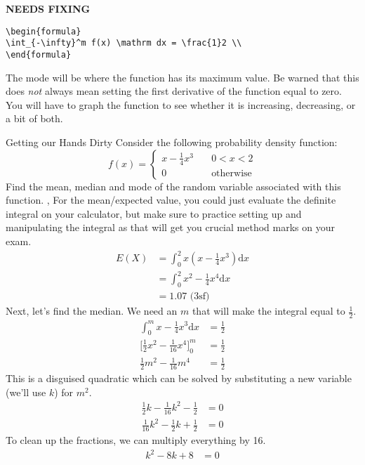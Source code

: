 \documentclass[../../main.tex]{subfiles}
\begin{document}
{\hfill\Large\bfseries NEEDS FIXING\hfill}
\begin{lstlisting}
\begin{formula}
\int_{-\infty}^m f(x) \mathrm dx = \frac{1}2 \\
\end{formula}
 \end{lstlisting}
The mode will be where the function has its maximum value. Be warned that this does \textit{not} always mean setting the first derivative of the function equal to zero. You will have to graph the function to see whether it is increasing, decreasing, or a bit of both.
\begin{example}{Getting our Hands Dirty}
Consider the following probability density function:
$$f(x) = 
        \begin{cases}
            x - \frac{1}{4}x^3 & \quad 0 < x < 2 \\
            0 & \quad \text{otherwise}
        \end{cases}
$$
Find the mean, median and mode of the random variable associated with this function. 
\sep
For the mean/expected value, you could just evaluate the definite integral on your calculator, but make sure to practice setting up and manipulating the integral as that will get you crucial method marks on your exam.
\begin{align}
    E(X) &= \int_0^2 x(x - \frac{1}{4}x^3) \mathrm dx \\
    &= \int_0^2 x^2- \frac{1}{4}x^4 \mathrm dx \\
    &= 1.07 \text{ (3sf)}
\end{align}
Next, let's find the median. We need an $m$ that will make the integral equal to $\frac{1}2$.
\begin{align}
    \int_0^m x - \frac{1}{4}x^3 \mathrm dx &= \frac{1}2 \\
    \Big[\frac{1}{2}x^2 - \frac{1}{16}x^4\Big]_0^m &= \frac{1}2 \\
    \frac{1}{2}m^2 - \frac{1}{16}m^4 &= \frac{1}2
\end{align}
This is a disguised quadratic which can be solved by substituting a new variable (we'll use $k$) for $m^2$.
\begin{align}
    \frac{1}{2}k - \frac{1}{16}k^2 - \frac{1}2 &= 0 \\
    \frac{1}{16}k^2 - \frac{1}{2}k + \frac{1}2 &= 0
\end{align}
To clean up the fractions, we can multiply everything by 16.
\begin{align}
   k^2 - 8k + 8 &= 0

\end{align}
\end{example}
\end{document}

